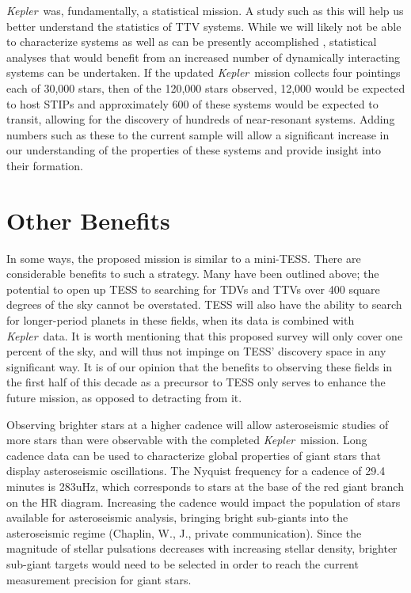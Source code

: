 \documentclass[12pt, preprint]{aastex}
\newcommand{\observatory}[1]{\textsl{#1}}
\newcommand{\kepler}{\observatory{Kepler}}
\newcommand{\Kepler}{\kepler}
\begin{document}
\Kepler\ was, fundamentally, a statistical mission. 
A study such as this will help us better understand the statistics of TTV 
 systems. 
While we will likely not be able to characterize systems as well as can be
 presently accomplished \citep[e.g. KOI-142,][]{Nesvorny13}, statistical
 analyses that would benefit from an increased number of dynamically 
 interacting systems can be undertaken.
If the updated \Kepler\ mission collects four pointings each of 30,000 stars, 
 then of the 120,000 stars observed, 12,000 would be expected to host STIPs
 and approximately 600 of these systems would be expected to transit, allowing 
 for the discovery of hundreds of near-resonant systems.
Adding numbers such as these to the current sample will allow a significant 
 increase in our understanding of the properties of these systems and provide
 insight into their formation.


 

\section{Other Benefits}
\label{AS}
In some ways, the proposed mission is similar to a mini-TESS. 
There are considerable benefits to such a strategy. 
Many have been outlined above; the potential to open up TESS to searching for 
 TDVs and TTVs over 400 square degrees of the sky cannot be overstated. 
TESS will also have the ability to search for longer-period planets in these 
 fields, when its data is combined with \Kepler\ data.
It is worth mentioning that this proposed survey will only cover one percent 
 of the sky, and will thus not impinge on TESS' discovery space in any 
 significant way. 
It is of our opinion that the benefits to observing these fields in the 
 first half of this decade as a precursor to TESS only serves to enhance 
 the future mission, as opposed to detracting from it.

Observing brighter stars at a higher cadence will allow asteroseismic 
 studies of more stars than were observable with the completed
  \Kepler\ mission. 
Long cadence data can be used to characterize global properties of giant stars
 that display asteroseismic oscillations. 
The Nyquist frequency for a cadence of 29.4 minutes is 283uHz,
 which corresponds to stars at the base of the red giant branch on the
 HR diagram. 
Increasing the cadence would impact the population of stars available for
 asteroseismic analysis, bringing bright sub-giants into the asteroseismic
 regime (Chaplin, W., J., private communication). 
Since the magnitude of stellar pulsations decreases with increasing
 stellar density, brighter sub-giant targets would need to be selected
 in order to reach the current measurement precision for giant stars.  
\end{document}
